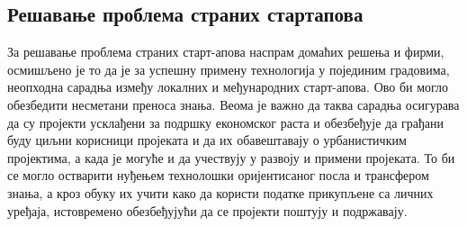 \documentclass{article}
\begin{document}
\subsection{Решавање проблема страних стартапова}
За решавање проблема страних старт-апова наспрам домаћих решења и фирми, осмишљено је то да је за успешну примену технологија у појединим градовима, неопходна сарадња између локалних и међународних старт-апова. Ово би могло обезбедити несметани преноса знања. Веома је важно да таква сарадња осигурава да су пројекти усклађени за подршку економског раста и обезбеђује да грађани буду циљни корисници пројеката и да их обавештавају о урбанистичким пројектима, а када је могуће и да учествују у развоју и примени пројеката. То би се могло остварити нуђењем технолошки оријентисаног посла и трансфером знања, а кроз обуку их учити како да користи податке прикупљене са личних уређаја, истовремено обезбеђујући да се пројекти поштују и подржавају.
\end{document}
